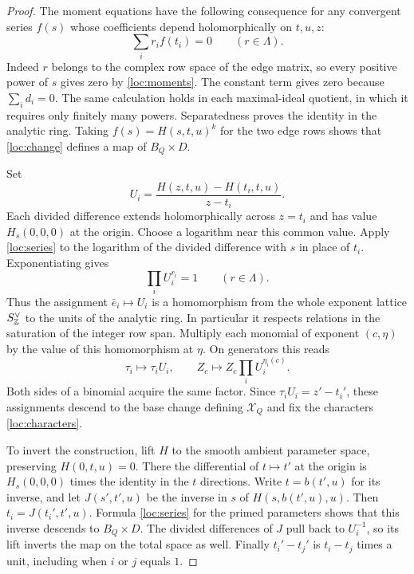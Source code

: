 \begin{proof}
The moment equations have the following consequence for any convergent
series $f(s)$ whose coefficients depend holomorphically on $t,u,z$:
\begin{equation}\label{loc:series}
              \sum_i r_i f(t_i)=0\qquad(r\in\Lambda).
\end{equation}
Indeed $r$ belongs to the complex row space of the edge matrix, so
every positive power of $s$ gives zero by \eqref{loc:moments}. The
constant term gives zero because $\sum_i d_i=0$. The same calculation
holds in each maximal-ideal quotient, in which it requires only
finitely many powers. Separatedness proves the identity in the analytic
ring. Taking $f(s)=H(s,t,u)^k$ for the two edge rows shows that
\eqref{loc:change} defines a map of $B_Q\times D$.

Set
\[
     U_i=\frac{H(z,t,u)-H(t_i,t,u)}{z-t_i}.
\]
Each divided difference extends holomorphically across $z=t_i$ and
has value $H_s(0,0,0)$ at the origin. Choose a logarithm near this
common value. Apply \eqref{loc:series} to the logarithm of the
divided difference with $s$ in place of $t_i$. Exponentiating gives
\begin{equation}\label{loc:units}
               \prod_i U_i^{r_i}=1 \qquad(r\in\Lambda).
\end{equation}
Thus the assignment $\bar e_i\mapsto U_i$ is a homomorphism from the
whole exponent lattice $S_\mathbb Z^\vee$ to the units of the analytic
ring. In particular it respects relations in the saturation of the
integer row span. Multiply each monomial of exponent $(c,\eta)$ by
the value of this homomorphism at $\eta$. On generators this reads
\[
        \tau_i\longmapsto\tau_i U_i,\qquad
        Z_c\longmapsto Z_c\prod_i U_i^{\eta_i(c)} .
\]
Both sides of a binomial acquire the same factor. Since
$\tau_iU_i=z'-t_i'$, these assignments descend to the base change
defining $\mathcal X_Q$ and fix the characters \eqref{loc:characters}.

To invert the construction, lift $H$ to the smooth ambient parameter
space, preserving $H(0,t,u)=0$. There the differential of
$t\mapsto t'$ at the origin is $H_s(0,0,0)$ times the identity in the
$t$ directions. Write $t=b(t',u)$ for its inverse, and let
$J(s',t',u)$ be the inverse in $s$ of $H(s,b(t',u),u)$.
Then $t_i=J(t_i',t',u)$. Formula \eqref{loc:series} for the primed
parameters shows that this inverse descends to $B_Q\times D$.
The divided differences of $J$ pull back to $U_i^{-1}$, so its lift
inverts the map on the total space as well. Finally $t_i'-t_j'$ is
$t_i-t_j$ times a unit, including when $i$ or $j$ equals $1$.
\end{proof}

